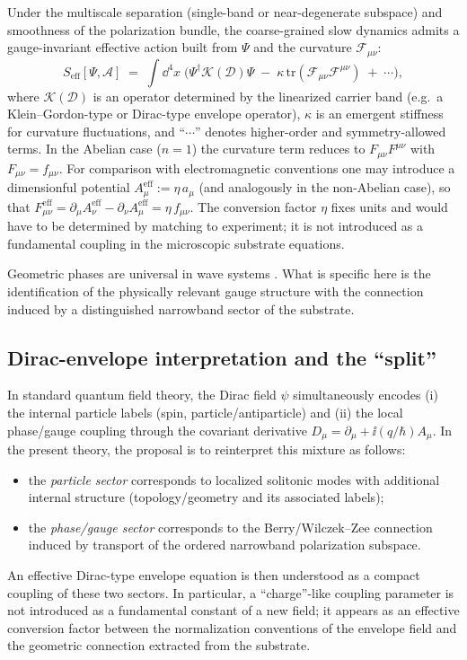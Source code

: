 Under the multiscale separation (single-band or near-degenerate subspace) and smoothness of the polarization bundle,
the coarse-grained slow dynamics admits a gauge-invariant effective action built from $\Psi$ and the curvature
$\mathcal{F}_{\mu\nu}$:
\begin{equation}
  S_{\text{eff}}[\Psi,\mathcal{A}]
  \;=\;\int \dd^4x\;
  \Big(
    \Psi^\dagger \mathcal{K}(\mathcal{D}) \Psi
    \;-\;\kappa\,\mathrm{tr}(\mathcal{F}_{\mu\nu}\mathcal{F}^{\mu\nu})
    \;+\;\cdots
  \Big),
  \label{eq:Seff}
\end{equation}
where $\mathcal{K}(\mathcal{D})$ is an operator determined by the linearized carrier band (e.g.\ a Klein--Gordon-type or
Dirac-type envelope operator), $\kappa$ is an emergent stiffness for curvature fluctuations, and ``$\cdots$'' denotes
higher-order and symmetry-allowed terms.
In the Abelian case ($n=1$) the curvature term reduces to $F_{\mu\nu}F^{\mu\nu}$ with $F_{\mu\nu}=f_{\mu\nu}$.
For comparison with electromagnetic conventions one may introduce a dimensionful potential
$A^{\mathrm{eff}}_\mu := \eta\,a_\mu$ (and analogously in the non-Abelian case),
so that $F^{\mathrm{eff}}_{\mu\nu}=\partial_\mu A^{\mathrm{eff}}_\nu-\partial_\nu A^{\mathrm{eff}}_\mu=\eta\,f_{\mu\nu}$.
The conversion factor $\eta$ fixes units and would have to be determined by matching to experiment; it is not introduced
as a fundamental coupling in the microscopic substrate equations.


Geometric phases are universal in wave systems \citep{Pancharatnam1956,Berry1984,WilczekZee1984,Bliokh2015SpinOrbit,Cisowski2022}.
What is specific here is the identification of the physically relevant gauge structure with the
connection induced by a distinguished narrowband sector of the substrate.

\subsection{Dirac-envelope interpretation and the ``split''}

In standard quantum field theory, the Dirac field $\psi$ simultaneously encodes (i) the internal particle labels
(spin, particle/antiparticle) and (ii) the local phase/gauge coupling through the covariant derivative
$D_\mu=\partial_\mu+\ii(q/\hbar)A_\mu$.
In the present theory, the proposal is to reinterpret this mixture as follows:
\begin{itemize}
\item the \emph{particle sector} corresponds to localized solitonic modes with additional internal structure
(topology/geometry and its associated labels);
\item the \emph{phase/gauge sector} corresponds to the Berry/Wilczek--Zee connection induced by transport of the
ordered narrowband polarization subspace.
\end{itemize}
An effective Dirac-type envelope equation is then understood as a compact coupling of these two sectors.
In particular, a ``charge''-like coupling parameter is not introduced as a fundamental constant of a new field;
it appears as an effective conversion factor between the normalization conventions of the envelope field and the
geometric connection extracted from the substrate.
